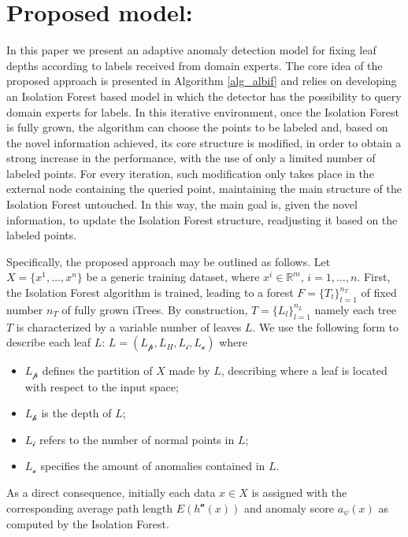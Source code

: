 \section{Proposed model: \approach}
\label{pm}
In this paper we present an adaptive anomaly detection model for fixing leaf depths according to labels received from domain experts.
The core idea of the proposed approach is presented in Algorithm \ref{alg_albif} and relies on developing an Isolation Forest based model in which the detector has the possibility to query domain experts for labels. In this iterative environment, once the Isolation Forest is fully grown, the algorithm can choose the points to be labeled and, based on the novel information achieved, its core structure is modified, in order to obtain a strong increase in the performance, with the use of only a limited number of labeled points. For every iteration, such modification only takes place in the external node containing the queried point, maintaining the main structure of the Isolation Forest untouched. In this way, the main goal is, given the novel information, to update the Isolation Forest structure, readjusting it based on the labeled points.  

%


Specifically, the proposed approach may be outlined as follows. Let $X=\{x^1,\dots, x^n\}$ be a generic training dataset, where $x^i \in \mathbb{R}^m$, $i=1,\dots,n$. First, the Isolation Forest algorithm is trained, leading to a forest $F=\{T_t\}_{t=1}^{n_T}$ of fixed number $n_T$ of fully grown iTrees. By construction, $T=\{L_l\}_{l=1}^{n_L}$ namely each tree $T$ is characterized by a variable number of leaves $L$. We use the following form to describe each leaf $L$:
$L=(L_\mathcal{p}, L_H, L_\mathcal{i}, L_\mathcal{o})$
where 
\begin{itemize}
    \item $L_\mathcal{p}$ defines the partition of $X$ made by $L$, describing where a leaf is located with respect to the input space;
    \item $L_\mathcal{h}$ is the depth of $L$;
    \item $L_\mathcal{i}$ refers to the number of normal points in $L$;
    \item $L_\mathcal{o}$ specifies the amount of anomalies contained in $L$.
\end{itemize}
As a direct consequence, initially each data $x \in X$ is assigned with the corresponding average path length $E(h^\mathcal{u}(x))$ and anomaly score $a_\psi(x)$ as computed by the Isolation Forest. 


